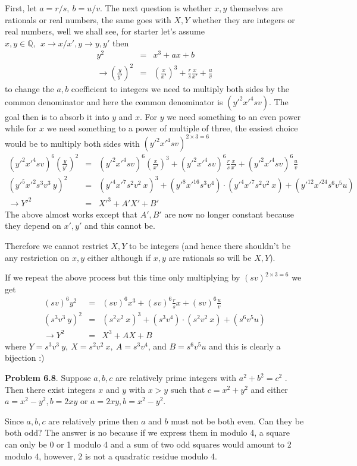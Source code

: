\documentclass[aps,preprint,preprintnumbers,nofootinbib,showpacs,prd]{revtex4-1}
\newcommand{\nbea}{\begin{eqnarray*}}
\newcommand{\neea}{\end{eqnarray*}}
\begin{document}
First, let $a = r/s,~b = u/v$. The next question is whether $x,y$ themselves are rationals or real numbers, the same goes with $X,Y$ whether they are integers or real numbers, well we shall see, for starter let's assume $x,y \in \mathbb{Q},~~ x \to x/x', y \to y,y' $ then
%
\nbea
y^2 & = & x^3 +ax+b \\
\to \left (\frac{y}{y'} \right )^2 & = & \left ( \frac{x}{x'} \right )^3 +\frac{r}{s}\frac{x}{x'}+\frac{u}{v}
\neea
%
to change the $a,b$ coefficient to integers we need to multiply both sides by the common denominator and here the common denominator is $(y'^2x'^4sv)$. The goal then is to absorb it into $y$ and $x$. For $y$ we need something to an even power while for $x$ we need something to a power of multiple of three, the easiest choice would be to multiply both sides with $(y'^2x'^4sv)^{2\times3=6}$
%
\nbea
(y'^2x'^4sv)^6 \left (\frac{y}{y'} \right )^2 & = & (y'^2x'^4sv)^6 \left ( \frac{x}{x'} \right )^3 + (y'^2x'^4sv)^6 \frac{r}{s}\frac{x}{x'} + (y'^2x'^4sv)^6 \frac{u}{v} \\
(y'^5x'^2s^3v^3~y)^2 & = & (y'^4 x'^7 s^2 v^2~x)^3 + (y'^8x'^{16} s^3 v^4) \cdot (y'^4 x'^7 s^2 v^2~x) + (y'^{12}x'^{24} s^6 v^5 u) \\
\to Y'^2 & = & X'^3 + A'X' + B'
\neea
%
The above almost works except that  $A', B'$ are now no longer constant because they depend on $x', y'$ and this cannot be.

Therefore we cannot restrict $X,Y$ to be integers (and hence there shouldn't be any restriction on $x,y$ either although if $x,y$ are rationals so will be $X,Y$).

If we repeat the above process but this time only multiplying by $(sv)^{2\times3=6}$ we get
%
\nbea
(sv)^6 y^2 & = & (sv)^6 x^3 + (sv)^6 \frac{r}{s}x + (sv)^6 \frac{u}{v} \\
(s^3v^3~y)^2 & = & (s^2 v^2~x)^3 + (s^3 v^4) \cdot (s^2 v^2~x) + (s^6 v^5 u) \\
\to Y^2 & = & X^3 + AX + B
\neea
%
where $Y = s^3v^3~y, ~ X = s^2 v^2~x, ~ A = s^3 v^4$, and $B = s^6 v^5 u$ and this is clearly a bijection :)

{\bf Problem 6.8}. Suppose $a, b, c$ are relatively prime integers with $a^2 + b^2 = c^2$ . Then there exist integers $x$ and $y$ with $x > y$ such that $c = x^2 + y^2$ and
either $a = x^2 - y^2 , b = 2xy$ or $a = 2xy, b = x^2 - y^2$.

Since $a, b, c$ are relatively prime then $a$ and $b$ must not be both even. Can they be both odd? The answer is no because if we express them in modulo 4, a square can only be 0 or 1 modulo 4 and a sum of two odd squares would amount to 2 modulo 4, however, 2 is not a quadratic residue modulo 4.
\end{document}
